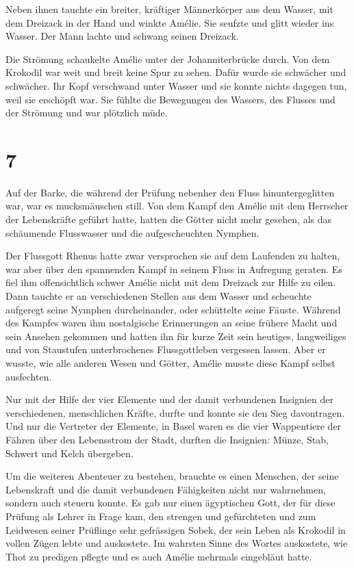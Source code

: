 \documentclass[11pt,titlepage,a5paper]{book}
\begin{document}
Neben ihnen tauchte ein breiter, kräftiger Männerkörper aus dem Wasser, mit dem Dreizack in der Hand und winkte Amélie. Sie seufzte und glitt wieder ins Wasser. Der Mann lachte und schwang seinen Dreizack. 

Die Strömung schaukelte Amélie unter der Johanniterbrücke durch. Von dem Krokodil war weit und breit keine Spur zu sehen. Dafür wurde sie schwächer und schwächer. Ihr Kopf verschwand unter Wasser und sie konnte nichts dagegen tun, weil sie erschöpft war. Sie fühlte die Bewegungen des Wassers, des Flusses und der Strömung und war plötzlich müde.

\section*{7}

Auf der Barke, die während der Prüfung nebenher den Fluss hinuntergeglitten war, war es mucksmäuschen still. Von dem Kampf den Amélie mit dem Herrscher der Lebenskräfte geführt hatte, hatten die Götter nicht mehr gesehen, als das schäumende Flusswasser und die aufgescheuchten Nymphen.

Der Flussgott Rhenus hatte zwar versprochen sie auf dem Laufenden zu halten, war aber über den spannenden Kampf in seinem Fluss in Aufregung geraten. Es fiel ihm offensichtlich schwer Amélie nicht mit dem Dreizack zur Hilfe zu eilen. Dann tauchte er an verschiedenen Stellen aus dem Wasser und scheuchte aufgeregt seine Nymphen durcheinander, oder schüttelte seine Fäuste. Während des Kampfes waren ihm nostalgische Erinnerungen an seine frühere Macht und sein Ansehen gekommen und hatten ihn für kurze Zeit sein heutiges, langweiliges und von Staustufen unterbrochenes Flussgottleben vergessen lassen.  Aber er wusste, wie alle anderen Wesen und Götter, Amélie musste diese Kampf selbst ausfechten. 

Nur mit der Hilfe der vier Elemente und der damit verbundenen Insignien der verschiedenen, menschlichen Kräfte, durfte und konnte sie den Sieg davontragen. Und nur die Vertreter der Elemente, in Basel waren es die vier Wappentiere der Fähren über den Lebensstrom der Stadt, durften die Insignien: Münze, Stab, Schwert und Kelch übergeben.

Um die weiteren Abenteuer zu bestehen, brauchte es einen Menschen, der seine Lebenskraft und die damit verbundenen Fähigkeiten nicht nur wahrnehmen, sondern auch steuern konnte. Es gab nur einen ägyptischen Gott, der für diese Prüfung als Lehrer in Frage kam, den strengen und gefürchteten und zum Leidwesen seiner Prüflinge sehr gefrässigen Sobek, der sein Leben als Krokodil in vollen Zügen lebte und auskostete. Im wahrsten Sinne des Wortes auskostete, wie Thot zu predigen pflegte und es auch Amélie mehrmals eingebläut hatte.
\end{document}
